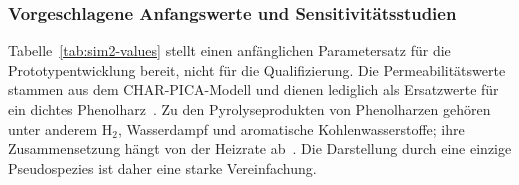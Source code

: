 \documentclass[oneside,openany]{amsdtx}
\begin{document}
\subsubsection{Vorgeschlagene Anfangswerte und Sensitivitätsstudien}

Tabelle~\ref{tab:sim2-values} stellt einen anfänglichen Parametersatz für die Prototypentwicklung bereit, nicht für die Qualifizierung. Die Permeabilitätswerte stammen aus dem CHAR-PICA-Modell und dienen lediglich als Ersatzwerte für ein dichtes Phenolharz~\cite{amar2016}. Zu den Pyrolyseprodukten von Phenolharzen gehören unter anderem \(\mathrm{H_2}\), Wasserdampf und aromatische Kohlenwasserstoffe; ihre Zusammensetzung hängt von der Heizrate ab~\cite{bessire2023}. Die Darstellung durch eine einzige Pseudospezies ist daher eine starke Vereinfachung.
\end{document}
